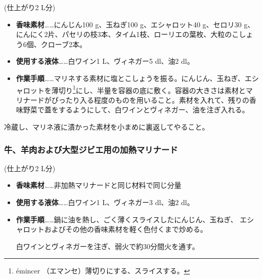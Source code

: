 \begin{recette}
(仕上がり2 L分)

\begin{itemize}
\item
  \textbf{香味素材}\ldots{}\ldots{}にんじん100 g、玉ねぎ100
  g、エシャロット40 g、セロリ30
  g、にんにく2片、パセリの枝3本、タイム1枝、ローリエの葉\undemi{}枚、大粒のこしょう6個、クローブ2本。
\item
  \textbf{使用する液体}\ldots{}\ldots{}白ワイン1\unquart{}
  L、ヴィネガー5 dl、油2\undemi{} dl。
\item
  \textbf{作業手順}\ldots{}\ldots{}マリネする素材に塩とこしょうを振る。にんじん、玉ねぎ、エシャロットを薄切り\footnote{émincer
    （エマンセ）薄切りにする、スライスする。}にし、半量を容器の底に敷く。容器の大きさは素材とマリナードがぴったり入る程度のものを用いること。素材を入れて、残りの香味野菜で蓋をするようにして、白ワインとヴィネガー、油を注ぎ入れる。
\end{itemize}

冷蔵し、マリネ液に漬かった素材を小まめに裏返してやること。

\maeaki

\hypertarget{marinade-cuite-pour-viandes-de-boucherie-ou-venaison}{%
\subsubsection{牛、羊肉および大型ジビエ用の加熱マリナード}\label{marinade-cuite-pour-viandes-de-boucherie-ou-venaison}}



(仕上がり2 L分)

\begin{itemize}
\item
  \textbf{香味素材}\ldots{}\ldots{}非加熱マリナードと同じ材料で同じ分量
\item
  \textbf{使用する液体}\ldots{}\ldots{}白ワイン1\undemi{} L、ヴィネガー3
  dl、油2\undemi{} dl。
\item
  \textbf{作業手順}\ldots{}\ldots{}鍋に油を熱し、ごく薄くスライスしたにんじん、玉ねぎ、
  エシャロットおよびその他の香味素材を軽く色付くまで炒める。

  白ワインとヴィネガーを注ぎ、弱火で約30分間火を通す。


\end{itemize}
\end{recette}
